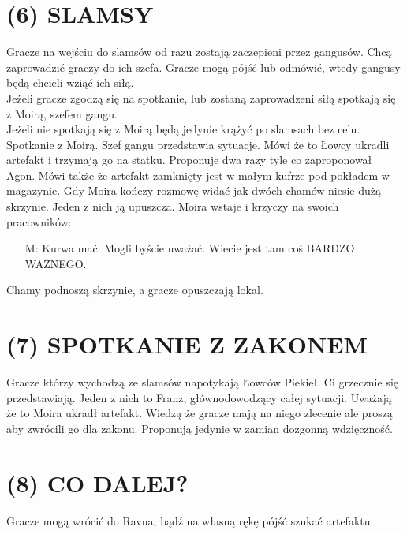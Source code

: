 \documentclass[14pt]{article}
\begin{document}
\section*{(6) SLAMSY}
\RaggedRight
Gracze na wejściu do slamsów od razu zostają zaczepieni przez gangusów. Chcą zaprowadzić graczy do ich szefa. Gracze mogą pójść lub odmówić, wtedy gangusy będą chcieli wziąć ich siłą. \\ Jeżeli gracze zgodzą się na spotkanie, lub zostaną zaprowadzeni siłą spotkają się z Moirą, szefem gangu. \\ Jeżeli nie spotkają się z Moirą będą jedynie krążyć po slamsach bez celu. \\
\vspace{5mm}
Spotkanie z Moirą. Szef gangu przedstawia sytuacje. Mówi że to Łowcy ukradli artefakt i trzymają go na statku. Proponuje dwa razy tyle co zaproponował Agon. Mówi także że artefakt zamknięty jest w małym kufrze pod pokładem w magazynie. Gdy Moira kończy rozmowę widać jak dwóch chamów niesie dużą skrzynie. Jeden z nich ją upuszcza. Moira wstaje i krzyczy na swoich pracowników:
\begin{itemize}
    \item[M:] Kurwa mać. Mogli byście uważać. Wiecie jest tam coś BARDZO WAŻNEGO. 
\end{itemize}
Chamy podnoszą skrzynie, a gracze opuszczają lokal.

\Centering
\section*{(7) SPOTKANIE Z ZAKONEM}
\RaggedRight
Gracze którzy wychodzą ze slamsów napotykają Łowców Piekieł. Ci grzecznie się przedstawiają. Jeden z nich to Franz, głównodowodzący całej sytuacji. Uważają że to Moira ukradł artefakt. Wiedzą że gracze mają na niego zlecenie ale proszą aby zwrócili go dla zakonu. Proponują jedynie w zamian dozgonną wdzięczność.

\Centering
\section*{(8) CO DALEJ?}
\RaggedRight
Gracze mogą wrócić do Ravna, bądź na własną rękę pójść szukać artefaktu.
\newpage

\Centering
\end{document}
